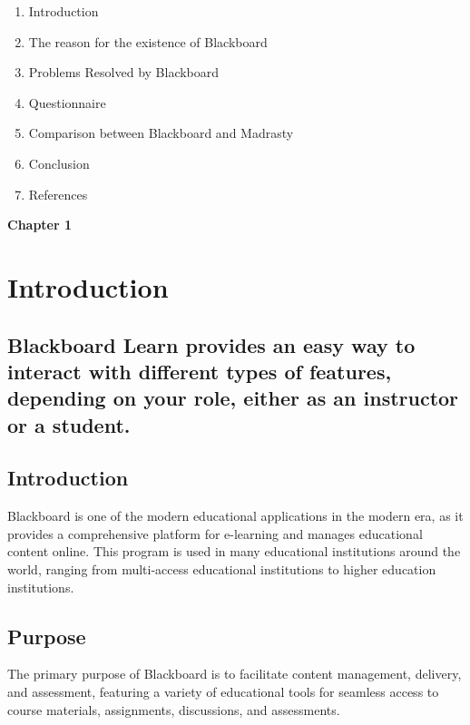 \documentclass[12pt]{article}
\begin{document}
	\begin{enumerate}
		\item Introduction 
		\item The reason for the existence of Blackboard 
		\item Problems Resolved by Blackboard 
		\item Questionnaire 
		\item Comparison between Blackboard and Madrasty 
		\item Conclusion 
		\item References 
	\end{enumerate}
	
	\newpage
		\begin{titlepage}		
				\centering
			\vspace*{1cm}
	\vfill

\textbf{\Huge{Chapter 1}} \\


\vfill

\large
		\end{titlepage}
	
	\section{Introduction}
\subsection*{\textbf{Blackboard Learn provides an easy way to interact with different types of features, depending on your role, either as an instructor or a student.}	}
	
	\subsection{Introduction}             Blackboard is one of the modern educational applications in the modern era, as it provides a comprehensive platform for e-learning and manages educational content online. This program is used in many educational institutions around the world, ranging from multi-access educational institutions to higher education institutions.
	
	\subsection{Purpose}
	    The primary purpose of Blackboard is to facilitate content management, delivery, and assessment, featuring a variety of educational tools for seamless access to course materials, assignments, discussions, and assessments.
	
\end{document}

